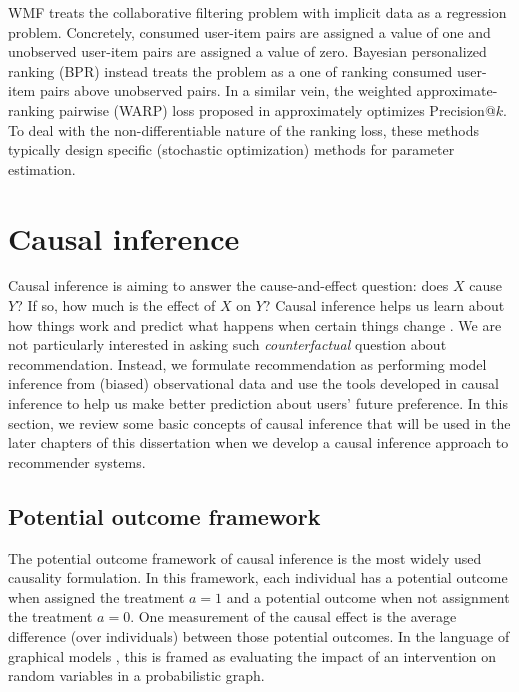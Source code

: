 \gls{WMF} treats the collaborative filtering problem with implicit data as a
regression problem. Concretely, consumed user-item pairs are assigned a
value of one and unobserved user-item pairs are assigned a value of zero.
Bayesian personalized ranking (BPR) \citep{rendle2009bpr,
rendle2014improving} instead treats the problem as a one of ranking
consumed user-item pairs above unobserved pairs.
In a similar vein, the weighted approximate-ranking pairwise (WARP) loss
proposed in \citet{weston2011wsabie} approximately optimizes Precision@$k$. 
To deal with the non-differentiable nature of the ranking
loss, these methods typically design specific (stochastic optimization)
methods for parameter estimation.


\section{Causal inference}\label{chpt:background:sec:causal}

Causal inference is aiming to answer the cause-and-effect question: does $X$ cause $Y$? If so, how much is the effect of $X$ on $Y$? Causal inference helps us learn about how things work and predict what happens when certain things change \citep{morgan2014counterfactuals,imbens2015causal}. We are not particularly interested in asking such \textit{counterfactual} question about recommendation. Instead, we formulate recommendation as performing model inference from (biased) observational data and use the tools developed in causal inference to help us make better prediction about users' future preference. In this section, we review some basic concepts of causal inference that will be used in the later chapters of this dissertation when we develop a causal inference approach to recommender systems.  

\subsection{Potential outcome framework}

The potential outcome framework of causal inference \citep{rubin1974ece} is the most widely used causality formulation. In this framework, each individual has a potential outcome when assigned the treatment $a = 1$ and a potential
outcome when not assignment the treatment $a = 0$. One measurement of the causal effect is the average difference (over individuals) between those potential outcomes. In the language of graphical models \citep{pearl2009causality},
this is framed as evaluating the impact of an intervention on random variables in a probabilistic graph. 


